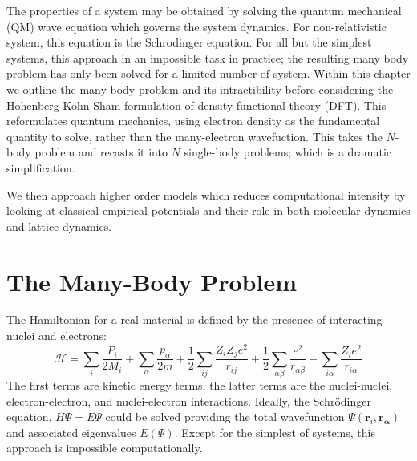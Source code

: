 The properties of a system may be obtained by solving the quantum mechanical (QM) wave equation which governs the system dynamics.  For non-relativistic system, this equation is the Schrodinger equation.  For all but the simplest systems, this approach in an impossible task in practice; the resulting many body problem has only been solved for a limited number of system.  Within this chapter we outline the many body problem and its intractibility before considering the Hohenberg-Kohn-Sham formulation of density functional theory (DFT).  This reformulates quantum mechanics, using electron density as the fundamental quantity to solve, rather than the many-electron wavefuction.  This takes the $N$-body problem and recasts it into $N$ single-body problems; which is a dramatic simplification.

We then approach higher order models which reduces computational intensity by looking at classical empirical potentials and their role in both molecular dynamics and lattice dynamics.

\section{The Many-Body Problem}

The Hamiltonian for a real material is defined by the presence of interacting nuclei and electrons:
\begin{equation}
	\mathcal{H} = \sum_i \frac{P_i}{2M_i}
	    + \sum_\alpha \frac{p_\alpha}{2m}
	    + \frac{1}{2} \sum_{ij} \frac{Z_i Z_j e^2}{r_{ij}}
	    + \frac{1}{2} \sum_{\alpha\beta} \frac{e^2}{r_{\alpha\beta}}
	    - \sum_{i\alpha} \frac{Z_i e^2}{r_{i\alpha}}
\end{equation}
The first terms are kinetic energy terms, the latter terms are the nuclei-nuclei, electron-electron, and nuclei-electron interactions.
Ideally, the Schr\"{o}dinger equation, $H\Psi=E\Psi$ could be solved providing the total wavefunction $\Psi(\bm{r}_i,\bm{r_\alpha})$ and associated eigenvalues $E(\Psi)$.
Except for the simplest of systems, this approach is impossible computationally.

